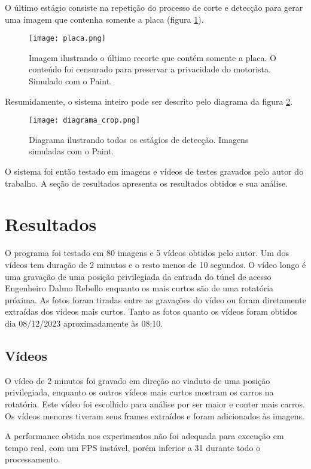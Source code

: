 \documentclass[conference]{IEEEtran}
\begin{document}
O último estágio consiste na repetição do processo de corte e detecção para gerar uma imagem que contenha somente a placa (figura \ref{fig:placa_recorte}).

\begin{figure}
    \centering
    \texttt{[image: placa.png]}
    \caption{Imagem ilustrando o último recorte que contém somente a placa. O conteúdo foi censurado para preservar a privacidade do motorista. Simulado com o Paint.}
    \label{fig:placa_recorte}
\end{figure}

Resumidamente, o sistema inteiro pode ser descrito pelo diagrama da figura \ref{fig:diagrama_sistema}.

\begin{figure}
    \centering
    \texttt{[image: diagrama\_crop.png]}
    \caption{Diagrama ilustrando todos os estágios de detecção. Imagens simuladas com o Paint.}
    \label{fig:diagrama_sistema}
\end{figure}

O sistema foi então testado em imagens e vídeos de testes gravados pelo autor do trabalho. A seção de resultados apresenta os resultados obtidos e sua análise.

\section{Resultados}
\label{sec:resultados}
O programa foi testado em 80 imagens e 5 vídeos obtidos pelo autor. Um dos vídeos tem duração de 2 minutos e o resto menos de 10 segundos.
O vídeo longo é uma gravação de uma posição privilegiada da entrada do túnel de acesso Engenheiro Dalmo Rebello enquanto os mais curtos são de uma rotatória próxima.
As fotos foram tiradas entre as gravações do vídeo ou foram diretamente extraídas dos vídeos mais curtos.
Tanto as fotos quanto os vídeos foram obtidos dia 08/12/2023 aproximadamente às 08:10.

\subsection{Vídeos}
O vídeo de 2 minutos foi gravado em direção ao viaduto de uma posição privilegiada, enquanto os outros vídeos mais curtos mostram os carros na rotatória.
Este vídeo foi escolhido para análise por ser maior e conter mais carros. Os vídeos menores tiveram seus frames extraídos e foram adicionados às imagens.

A performance obtida nos experimentos não foi adequada para execução em tempo real, com um FPS instável, porém inferior a 31 durante todo o processamento.
\end{document}
